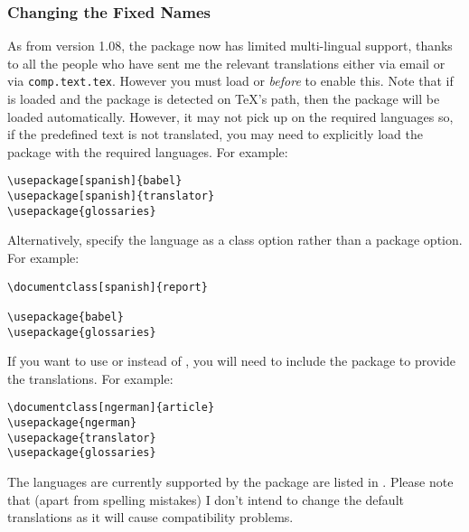 \documentclass{nlctdoc}
\begin{document}
\subsubsection{Changing the Fixed Names}
\label{sec:fixednames}

As from version 1.08, the  package now has
limited multi-lingual support, thanks to all the people who have sent
me the relevant translations either via email or via 
\texttt{comp.text.tex}.
However you must load  or  \emph{before} 
 to enable this. Note that if  is loaded 
and the  package is detected on \TeX's path, then the
 package will be loaded automatically.  However,
it may not pick up on the required languages so, if the predefined
text is not translated, you may need to explicitly load the
 package with the required languages. For example:
\begin{verbatim}
\usepackage[spanish]{babel}
\usepackage[spanish]{translator}
\usepackage{glossaries}
\end{verbatim}
Alternatively, specify the language as a class option rather
than a package option. For example:
\begin{verbatim}
\documentclass[spanish]{report}

\usepackage{babel}
\usepackage{glossaries}
\end{verbatim}

If you want to use  or  instead
of , you will need to include the  package 
to provide the translations. For example:
\begin{verbatim}
\documentclass[ngerman]{article}
\usepackage{ngerman}
\usepackage{translator}
\usepackage{glossaries}
\end{verbatim}

The languages are currently supported by the
 package are listed in
. Please note that (apart from
spelling mistakes) I don't intend to change the default translations
as it will cause compatibility problems.
\end{document}
